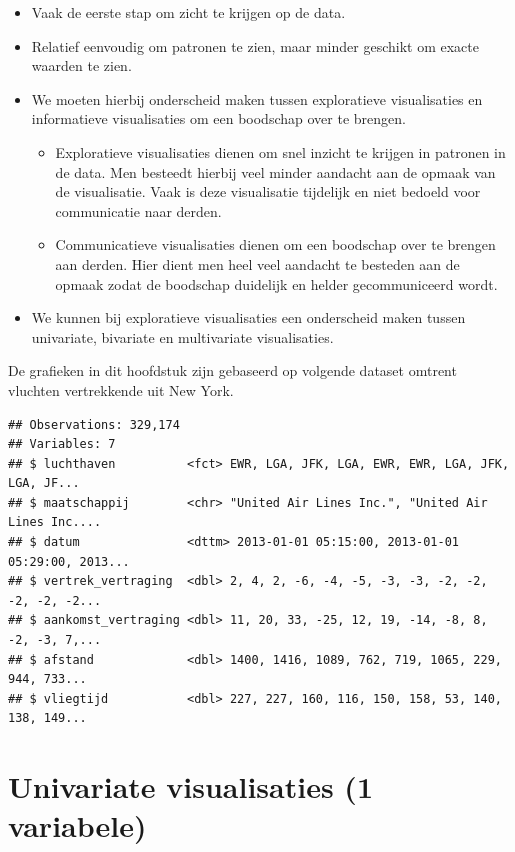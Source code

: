 \documentclass[]{tufte-book}
\providecommand{\tightlist}{%
  \setlength{\itemsep}{0pt}\setlength{\parskip}{0pt}}
\begin{document}
\begin{itemize}
\tightlist
\item
  Vaak de eerste stap om zicht te krijgen op de data.
\item
  Relatief eenvoudig om patronen te zien, maar minder geschikt om exacte waarden te zien.
\item
  We moeten hierbij onderscheid maken tussen exploratieve visualisaties en informatieve visualisaties om een boodschap over te brengen.

  \begin{itemize}
  \tightlist
  \item
    Exploratieve visualisaties dienen om snel inzicht te krijgen in patronen in de data. Men besteedt hierbij veel minder aandacht aan de opmaak van de visualisatie. Vaak is deze visualisatie tijdelijk en niet bedoeld voor communicatie naar derden.
  \item
    Communicatieve visualisaties dienen om een boodschap over te brengen aan derden. Hier dient men heel veel aandacht te besteden aan de opmaak zodat de boodschap duidelijk en helder gecommuniceerd wordt.
  \end{itemize}
\item
  We kunnen bij exploratieve visualisaties een onderscheid maken tussen univariate, bivariate en multivariate visualisaties.
\end{itemize}

De grafieken in dit hoofdstuk zijn gebaseerd op volgende dataset omtrent vluchten vertrekkende uit New York.

\begin{verbatim}
## Observations: 329,174
## Variables: 7
## $ luchthaven          <fct> EWR, LGA, JFK, LGA, EWR, EWR, LGA, JFK, LGA, JF...
## $ maatschappij        <chr> "United Air Lines Inc.", "United Air Lines Inc....
## $ datum               <dttm> 2013-01-01 05:15:00, 2013-01-01 05:29:00, 2013...
## $ vertrek_vertraging  <dbl> 2, 4, 2, -6, -4, -5, -3, -3, -2, -2, -2, -2, -2...
## $ aankomst_vertraging <dbl> 11, 20, 33, -25, 12, 19, -14, -8, 8, -2, -3, 7,...
## $ afstand             <dbl> 1400, 1416, 1089, 762, 719, 1065, 229, 944, 733...
## $ vliegtijd           <dbl> 227, 227, 160, 116, 150, 158, 53, 140, 138, 149...
\end{verbatim}

\hypertarget{univariate-visualisaties-1-variabele}{%
\section{Univariate visualisaties (1 variabele)}\label{univariate-visualisaties-1-variabele}}
\end{document}
